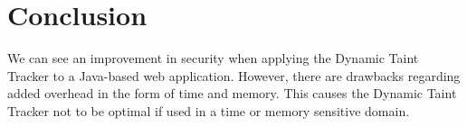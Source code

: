 \chapter{Conclusion}
We can see an improvement in security when applying the Dynamic Taint Tracker to a Java-based web application. However, there are drawbacks regarding added overhead in the form of time and memory. This causes the Dynamic Taint Tracker not to be optimal if used in a time or memory sensitive domain.